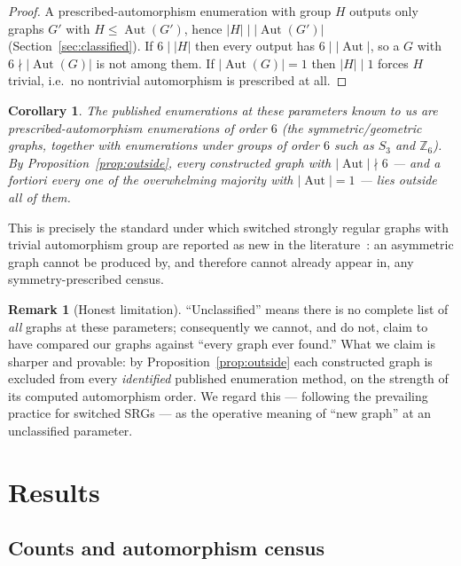\documentclass[11pt]{article}
\newtheorem{corollary}{Corollary}
\theoremstyle{definition}
\newtheorem{remark}{Remark}
\newcommand{\Aut}{\operatorname{Aut}}
\begin{document}
\begin{proof}
A prescribed-automorphism enumeration with group $H$ outputs only graphs $G'$ with $H\le
\Aut(G')$, hence $|H|\mid|\Aut(G')|$ (Section~\ref{sec:classified}). If $6\mid|H|$ then
every output has $6\mid|\Aut|$, so a $G$ with $6\nmid|\Aut(G)|$ is not among them. If
$|\Aut(G)|=1$ then $|H|\mid 1$ forces $H$ trivial, i.e.\ no nontrivial automorphism is
prescribed at all.
\end{proof}

\begin{corollary}\label{cor:new}
The published enumerations at these parameters known to us are prescribed-automorphism
enumerations of order $6$ (the symmetric/geometric graphs, together with enumerations
under groups of order $6$ such as $S_3$ and $\mathbb{Z}_6$). By
Proposition~\ref{prop:outside}, every constructed graph with $|\Aut|\nmid 6$ --- and a
fortiori every one of the overwhelming majority with $|\Aut|=1$ --- lies outside all of
them.
\end{corollary}

This is precisely the standard under which switched strongly regular graphs with trivial
automorphism group are reported as new in the literature~\cite{ihringer2020}: an
asymmetric graph cannot be produced by, and therefore cannot already appear in, any
symmetry-prescribed census.

\begin{remark}[Honest limitation]\label{rem:caveat}
``Unclassified'' means there is no complete list of \emph{all} graphs at these parameters;
consequently we cannot, and do not, claim to have compared our graphs against ``every
graph ever found.'' What we claim is sharper and provable: by Proposition~\ref{prop:outside}
each constructed graph is excluded from every \emph{identified} published enumeration
method, on the strength of its computed automorphism order. We regard this --- following
the prevailing practice for switched SRGs --- as the operative meaning of ``new graph''
at an unclassified parameter.
\end{remark}

\section{Results}\label{sec:results}

\subsection{Counts and automorphism census}
\end{document}
